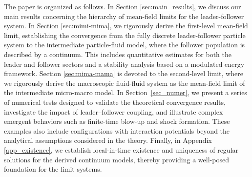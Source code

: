 \documentclass[10pt, reqno]{amsart}
\theoremstyle{definition}
\theoremstyle{remark}
\numberwithin{equation}{section}
\begin{document}
 The paper is organized as follows. In Section \ref{sec:main_results}, we discuss our main results concerning the hierarchy of mean-field limits for the leader-follower system. In Section \ref{sec:mimi-mima}, we rigorously derive the first-level mean-field limit, establishing the convergence from the fully discrete leader-follower particle system to the intermediate particle-fluid model, where the follower population is described by a continuum. This includes quantitative estimates for both the leader and follower sectors and a stability analysis based on a modulated energy framework. Section \ref{sec:mima-mama} is devoted to the second-level limit, where we rigorously derive the macroscopic fluid-fluid system as the mean-field limit of the intermediate micro-macro model. In Section~\ref{sec_numer}, we present a series of numerical tests designed to validate the theoretical convergence results, investigate the impact of leader–follower coupling, and illustrate complex emergent behaviors such as finite-time blow-up and shock formation. These examples also include configurations with interaction potentials beyond the analytical assumptions considered in the theory. Finally, in Appendix \ref{app_existence}, we establish local-in-time existence and uniqueness of regular solutions for the derived continuum models, thereby providing a well-posed foundation for the limit systems.



\end{document}
